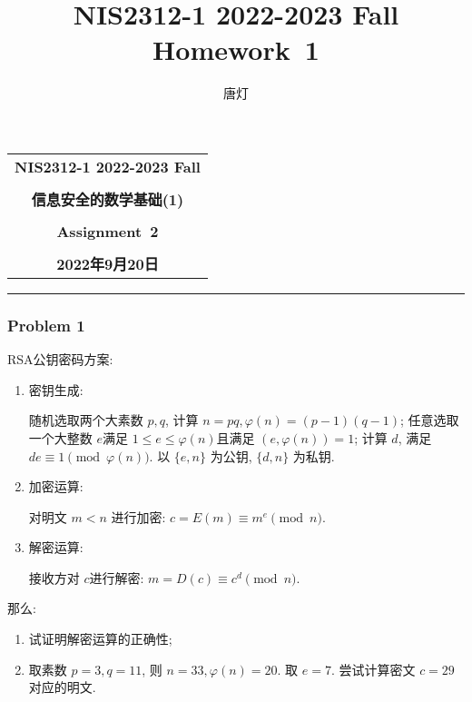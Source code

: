 \documentclass[a4paper,12pt]{ctexart}
\title{NIS2312-1 2022-2023 Fall Homework~1}
\author{唐灯}
\begin{document}
  \begin{center}

  \vspace{-0.3in}
  \begin{tabular}{c}
    \textbf{\Large NIS2312-1 2022-2023 Fall} \\
    \textbf{\Large  } \\
    \textbf{\Large  信息安全的数学基础(1)} \\
    \textbf{\Large  } \\
    \textbf{\Large  Assignment~2} \\
    \textbf{\Large  } \\
    \textbf{\Large 2022年9月20日} \\
  \end{tabular}
  \end{center}
  \noindent
  \rule{\linewidth}{0.4pt}
  
  
  \subsubsection*{Problem 1} 
      RSA公钥密码方案: 
      \begin{enumerate}[label=(\arabic*)]
          \item 密钥生成:
          
          随机选取两个大素数 $ p,q $, 计算 $ n=pq,\varphi(n)=(p-1)(q-1) $; 任意选取一个大整数 $ e $满足
          $ 1\le e\le \varphi(n) $且满足 $ (e,\varphi(n))=1 $; 计算 $ d $, 满足 $ de\equiv 1\pmod{\varphi(n)} $. 
          以 $ \{e, n\} $ 为公钥, $ \{d, n\} $ 为私钥. 
          
          \item 加密运算:
          
          对明文 $m < n$ 进行加密: $ c = E(m) \equiv m^e \pmod{n} $.
          \item 解密运算:
          
          接收方对 $ c $进行解密: $ m = D(c) \equiv c^d \pmod{n} $.
        \end{enumerate}
        那么: 
        \begin{enumerate}[label=(\arabic*)]
            \item 试证明解密运算的正确性;
            \item 取素数 $ p=3,q=11 $, 则 $ n=33,\varphi(n)=20 $. 取 $ e=7 $. 尝试计算密文 $ c=29 $对应的明文.
        \end{enumerate}
\end{document}
